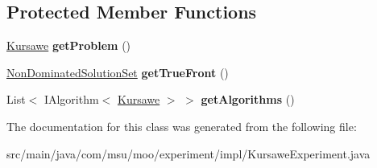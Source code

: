 \subsection*{Protected Member Functions}
\begin{DoxyCompactItemize}
\item 
\hypertarget{classcom_1_1msu_1_1moo_1_1experiment_1_1impl_1_1KursaweExperiment_a43e511805fc6818fcb914b5e61a7c9b4}{\hyperlink{classcom_1_1msu_1_1moo_1_1problems_1_1Kursawe}{Kursawe} {\bfseries get\-Problem} ()}\label{classcom_1_1msu_1_1moo_1_1experiment_1_1impl_1_1KursaweExperiment_a43e511805fc6818fcb914b5e61a7c9b4}

\item 
\hypertarget{classcom_1_1msu_1_1moo_1_1experiment_1_1impl_1_1KursaweExperiment_ae4f11e4be9bc76ecaf316ceb836b4cc4}{\hyperlink{classcom_1_1msu_1_1moo_1_1model_1_1solution_1_1NonDominatedSolutionSet}{Non\-Dominated\-Solution\-Set} {\bfseries get\-True\-Front} ()}\label{classcom_1_1msu_1_1moo_1_1experiment_1_1impl_1_1KursaweExperiment_ae4f11e4be9bc76ecaf316ceb836b4cc4}

\item 
\hypertarget{classcom_1_1msu_1_1moo_1_1experiment_1_1impl_1_1KursaweExperiment_a308ef56d8356092caf2a2fd96a0c709b}{List$<$ I\-Algorithm$<$ \hyperlink{classcom_1_1msu_1_1moo_1_1problems_1_1Kursawe}{Kursawe} $>$ $>$ {\bfseries get\-Algorithms} ()}\label{classcom_1_1msu_1_1moo_1_1experiment_1_1impl_1_1KursaweExperiment_a308ef56d8356092caf2a2fd96a0c709b}

\end{DoxyCompactItemize}


The documentation for this class was generated from the following file\-:\begin{DoxyCompactItemize}
\item 
src/main/java/com/msu/moo/experiment/impl/Kursawe\-Experiment.\-java\end{DoxyCompactItemize}
